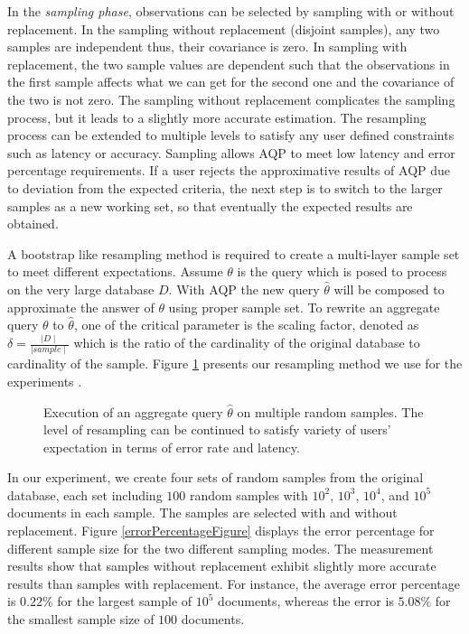 In the {\it sampling phase}, observations can be selected by sampling with or without replacement. In the sampling without replacement (disjoint samples), any two samples are independent thus, their covariance is zero. In sampling with replacement, the two sample values are dependent such that the observations in the first sample affects what we can get for the second one and the covariance of the two is not zero. The sampling without replacement complicates the sampling process, but it leads to a slightly more accurate estimation. The resampling process can be extended to multiple levels to satisfy any user defined constraints  such as latency or accuracy. Sampling allows AQP to meet low latency and error percentage requirements. If a user rejects the approximative results of AQP due to deviation from the expected criteria, the next step is to switch to the larger samples as a new working set, so that eventually the expected results are obtained. 


A bootstrap like resampling method is required to create a multi-layer sample set to meet different expectations. Assume $\theta$ is the query which is posed to process on the very large database $D$. With AQP the new query $\hat{\theta}$ will be composed to approximate the answer of $\theta$ using proper sample set. To rewrite an aggregate query $\theta$ to $\hat{\theta}$, one of the critical parameter is the scaling factor, denoted as $\delta=\frac{\mid D\mid}{\mid sample \mid}$ which is the ratio of the cardinality of the original database to cardinality of the sample. Figure \ref{samplingFigure} presents our resampling method we use for the experiments \cite{Agarwal:2014:KYW:2588555.2593667,babcock2003dynamic}.


\begin{figure}[H]
\centering
\resizebox{0.6\textwidth}{!}{}
\caption{Execution of an aggregate query $\hat{\theta}$ on multiple random samples. The level of resampling can be continued to satisfy variety of users' expectation in terms of error rate and latency.}
\label{samplingFigure}
\end{figure}

In our experiment, we create four sets of random samples from the original database, each set including $100$ random samples with $10^2$, $10^3$, $10^4$, and $10^5$ documents in each sample. The samples are selected with and without replacement. Figure \ref{errorPercentageFigure} displays the error percentage for different sample size for the two different sampling modes. The measurement results show that samples without replacement exhibit slightly more accurate results than samples with replacement. For instance, the average error percentage is  $0.22\%$ for the largest sample of $10^5$ documents, whereas the error is $5.08\%$  for the smallest sample size of $100$  documents. 


